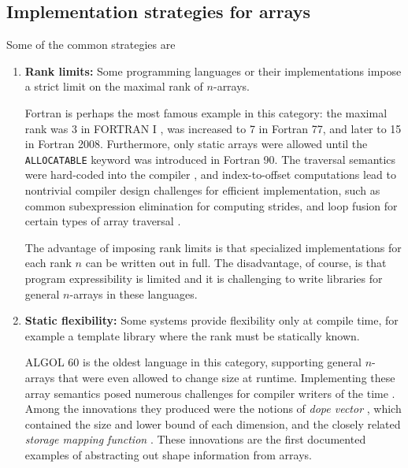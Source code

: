 \documentclass[preprint]{sigplanconf}
\newcommand{\ALGOL}{A\textsc{LGOL}}
\newcommand{\code}[1]{\texttt{#1}}
\begin{document}
\subsection{Implementation strategies for arrays}

Some of the common strategies are

\begin{enumerate}

\item {\bf Rank limits:} Some programming languages or their implementations
impose a strict limit on the maximal rank of $n$-arrays.

Fortran is perhaps the most famous example in this category: the maximal rank
was 3 in FORTRAN I \cite{Backus:1957fa}, was increased to 7 in Fortran 77,
and later to 15 in Fortran 2008. Furthermore, only static arrays were allowed
until the \code{ALLOCATABLE} keyword was introduced in Fortran 90. The
traversal semantics were hard-coded into the compiler \cite[pp.~10--
11]{Backus:1956pr}, and index-to-offset computations lead to nontrivial
compiler design challenges for efficient implementation, such as common
subexpression elimination for computing strides, and loop fusion for certain
types of array traversal \cite{Busam:1969oe}.



The advantage of imposing rank limits is that specialized implementations for
each rank $n$ can be written out in full. The disadvantage, of course, is that
program expressibility is limited and it is challenging to write libraries for
general $n$-arrays in these languages.

\item {\bf Static flexibility:} Some systems provide flexibility only at
compile time, for example a template library where the rank must be statically
known.

\ALGOL{} 60 is the oldest language in this category, supporting general
$n$-arrays that were even allowed to change size at runtime. Implementing
these array semantics posed numerous challenges for compiler writers of the
time \cite{Randell:1964a6}. Among the innovations they produced were the
notions of \textit{dope vector} \cite{Sattley:1960as, Sattley:1961as}, which
contained the size and lower bound of each dimension, and the closely related
\textit{storage mapping function} \cite[pp.~80--87]{Randell:1964a6}. These
innovations are the first documented examples of abstracting out shape
information from arrays.


\end{enumerate}
\end{document}
